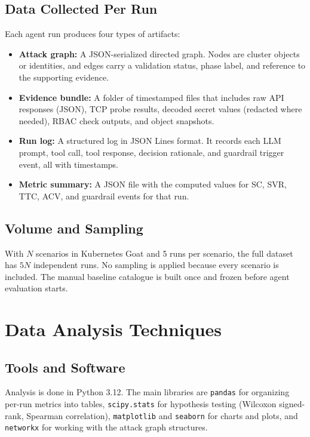 \documentclass[conference]{IEEEtran}
\begin{document}
\subsection{Data Collected Per Run}
Each agent run produces four types of artifacts:
\begin{itemize}
    \item \textbf{Attack graph:} A JSON-serialized directed graph. Nodes are cluster objects or identities, and edges carry a validation status, phase label, and reference to the supporting evidence.
    \item \textbf{Evidence bundle:} A folder of timestamped files that includes raw API responses (JSON), TCP probe results, decoded secret values (redacted where needed), RBAC check outputs, and object snapshots.
    \item \textbf{Run log:} A structured log in JSON Lines format. It records each LLM prompt, tool call, tool response, decision rationale, and guardrail trigger event, all with timestamps.
    \item \textbf{Metric summary:} A JSON file with the computed values for SC, SVR, TTC, ACV, and guardrail events for that run.
\end{itemize}

\subsection{Volume and Sampling}
With $N$ scenarios in Kubernetes Goat and 5 runs per scenario, the full dataset has $5N$ independent runs. No sampling is applied because every scenario is included. The manual baseline catalogue is built once and frozen before agent evaluation starts.

\section{Data Analysis Techniques}

\subsection{Tools and Software}
Analysis is done in Python 3.12. The main libraries are \texttt{pandas} for organizing per-run metrics into tables, \texttt{scipy.stats} for hypothesis testing (Wilcoxon signed-rank, Spearman correlation), \texttt{matplotlib} and \texttt{seaborn} for charts and plots, and \texttt{networkx} for working with the attack graph structures.
\end{document}
